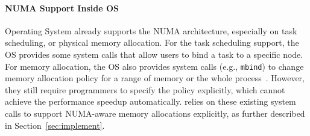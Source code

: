 \begin{comment}
\paragraph{Node Imbalance:} When some memory controllers have much more memory accesses than others, it may cause the node imbalance issue. Therefore, some tasks may wait more time for memory accesses, thwarting the whole progress of a multithreaded application.  

\paragraph{Interconnect Congestion:} Interconnect congestion occurs if some tasks are placed in remote nodes that may use the inter-node interconnection to access their memory. 

\paragraph{Remote Accesses:} In NUMA architecture, local nodes can be accessed with less latency than remote accesses. Therefore, it is important to reduce remote accesses to improve the performance.\\


 Based on the study~\cite{Blagodurov:2011:CNC:2002181.2002182}, node imbalance and interconnect congestion may have a larger performance impact than cache contention and remote accesses. These performance issues cannot be solved by the hardware automatically. Software support is required to control the placement of tasks, physical pages, and objects to achieve the optimal performance for multithreaded applications.  

	
\end{comment}

\paragraph{NUMA Support Inside OS} Operating System already supports the NUMA architecture, especially on task scheduling, or physical memory allocation. For the task scheduling support, the OS provides some system calls that allow users to bind a task to a specific node. For memory allocation, the OS also provides system calls (e.g., \texttt{mbind}) to change memory allocation policy for a range of memory or the whole process~\cite{lameter2013numa, diener2015locality}. However, they still require programmers to specify the policy explicitly, which cannot achieve the performance speedup automatically. \NM{} relies on these existing system calls to support NUMA-aware memory allocations explicitly, as further described in Section~\ref{sec:implement}.


